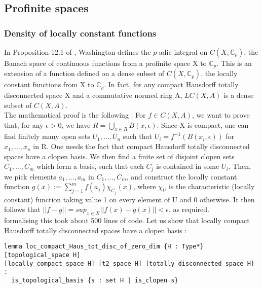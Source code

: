 \documentclass[a4paper,UKenglish,cleveref, autoref, thm-restate]{lipics-v2021}
\begin{document}
\subsection{Profinite spaces}
\subsubsection{Density of locally constant functions}
In Proposition 12.1 of \cite{cyc}, Washington defines the $p$-adic integral on $C(X, \mathbb{C}_p)$,
the Banach space of continuous functions from a profinite space X to $\mathbb{C}_p$.
This is an extension of a function defined on a dense subset of $C(X, \mathbb{C}_p)$, the
locally constant functions from X to $\mathbb{C}_p$. In fact, for any compact
Hausdorff totally disconnected space X and a commutative
normed ring A, $LC(X, A)$ is a dense subset of $C(X, A)$. \\

The mathematical proof is the following : For $f \in C(X, A)$, we want to prove that,
for any $\epsilon > 0$, we have $R = \bigcup_{x \in R} B(x, \epsilon)$. Since X is compact,
one can find finitely many open sets $U_1, \dots, U_n$ such that $U_i = f^{-1}(B(x_i, \epsilon))$
for $x_1, \dots, x_n$ in R. One needs the fact that compact Hausdorff totally disconnected spaces
have a clopen basis. We then find a finite set of disjoint clopen sets $C_1, \dots, C_m$ which form
a basis, such that each $C_j$ is contained in some $U_i$.
Then, we pick elements $a_1, \dots, a_m$ in $C_1, \dots, C_m$, and construct the locally constant
function $g(x) := \sum_{j = 1}^m f(a_j) \chi_{C_j}(x)$, where $\chi_U$ is the characteristic
(locally constant) function taking value 1 on every element of U and 0 otherwise. It then follows
that $|| f - g || = sup_{x \in X} ||f(x) - g(x)|| < \epsilon$, as required. \\

formalising this took about 500 lines of code. Let us show that locally compact Hausdorff
totally disconnected spaces have a clopen basis :

\begin{lstlisting}
lemma loc_compact_Haus_tot_disc_of_zero_dim {H : Type*} [topological_space H] 
[locally_compact_space H] [t2_space H] [totally_disconnected_space H] :
  is_topological_basis {s : set H | is_clopen s}
\end{lstlisting}
\end{document}
